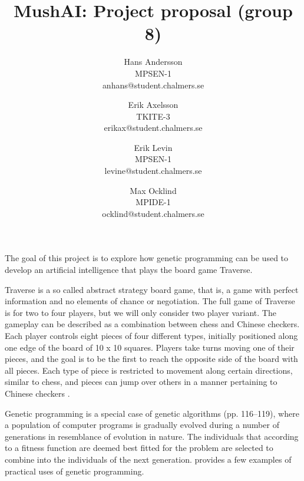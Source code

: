 \documentclass[times, 10pt,twocolumn]{article}
\begin{document}
\title{MushAI: Project proposal (group 8)}

\author{Hans Andersson\\
MPSEN-1\\anhans@student.chalmers.se\\
\and
Erik Axelsson\\
TKITE-3\\
erikax@student.chalmers.se\\
\and
Erik Levin\\
MPSEN-1\\
levine@student.chalmers.se
\and
Max Ocklind\\
MPIDE-1\\
ocklind@student.chalmers.se
}

\maketitle
\thispagestyle{empty}



The goal of this project is to explore how genetic programming can be used to develop an artificial intelligence that plays the board game Traverse.

Traverse is a so called abstract strategy board game, that is, a game with perfect information and no elements of chance or negotiation. The full game of Traverse is for two to four players, but we will only consider two player variant. The gameplay can be described as a combination between chess and Chinese checkers. Each player controls eight pieces of four different types, initially positioned along one edge of the board of 10 x 10 squares. Players take turns moving one of their pieces, and the goal is to be the first to reach the opposite side of the board with all pieces. Each type of piece is restricted to movement along certain directions, similar to chess, and pieces can jump over others in a manner pertaining to Chinese checkers \cite{rules}.

Genetic programming is a special case of genetic algorithms \cite{course_book} (pp. 116--119), where a population of computer programs is gradually evolved during a number of generations in resemblance of evolution in nature. The individuals that according to a fitness function are deemed best fitted for the problem are selected to combine into the individuals of the next generation. \cite{gpiv} provides a few examples of practical uses of genetic programming.
\end{document}
